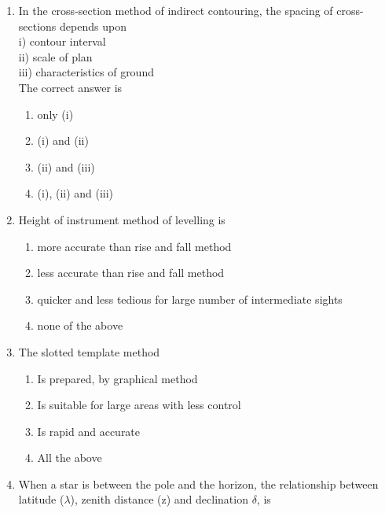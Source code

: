 \documentclass[11pt,a4paper]{article}
\begin{document}
\begin{enumerate}
{iv) altitude bubble on telescope if it is to be used as a level  \\
The correct answer is}
\begin{enumerate}[label=\Alph*.]
\item{only (i)}
\item{both (i) and (iv)}
\item{only (iii)}
\item{both (ii) and (iii)}
\end{enumerate}
\item{In the cross-section method of indirect contouring, the spacing of cross-sections depends upon \\
i) contour interval \\
ii) scale of plan \\
iii) characteristics of ground \\
The correct answer is}
\begin{enumerate}[label=\Alph*.]
\item{only (i)}
\item{(i) and (ii)}
\item{(ii) and (iii)}
\item{(i), (ii) and (iii)}
\end{enumerate}
\item{Height of instrument method of levelling is}
\begin{enumerate}[label=\Alph*.]
\item{more accurate than rise and fall method}
\item{less accurate than rise and fall method}
\item{quicker and less tedious for large number of intermediate sights}
\item{none of the above}
\end{enumerate}
\item{The slotted template method}
\begin{enumerate}[label=\Alph*.]
\item{Is prepared, by graphical method}
\item{Is suitable for large areas with less control}
\item{Is rapid and accurate}
\item{All the above}
\end{enumerate}
\item{When a star is between the pole and the horizon, the relationship between latitude ($\lambda$), zenith distance (z) and declination $\delta$, is
}
\begin{enumerate}[label=\Alph*.]

\end{enumerate}
\end{enumerate}
\end{document}
